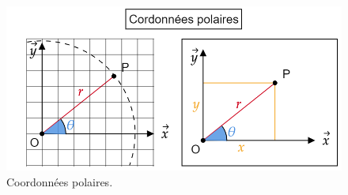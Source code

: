 \documentclass[
	11pt, %
	fleqn, %
	a4paper, %
]{LegrandOrangeBook}
\begin{document}
\begin{figure}[H] %
	\centering %
	\includegraphics[width=1\textwidth]{Images/pol2.png} %
	\caption{Coordonnées polaires.}
	\label{pol2} %
\end{figure}
\end{document}
